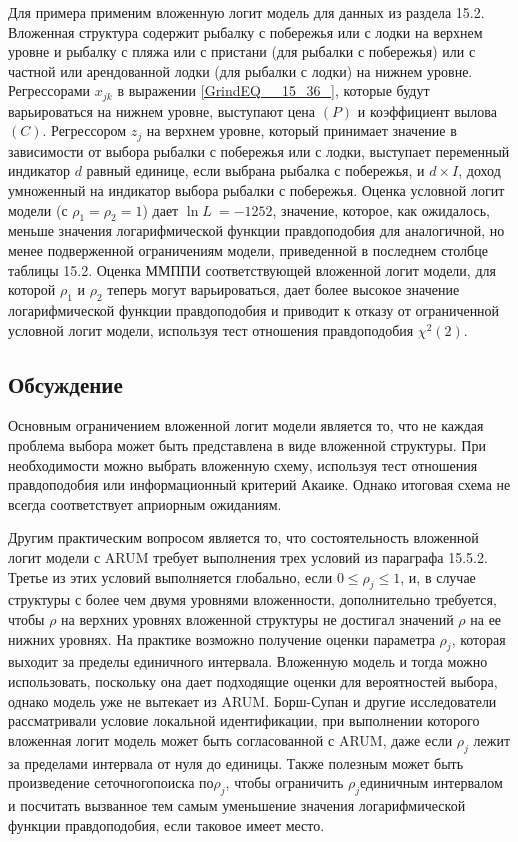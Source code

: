 Для примера применим вложенную логит модель для данных из раздела 15.2. Вложенная структура содержит рыбалку с побережья или с лодки на верхнем уровне и рыбалку с пляжа или с пристани (для рыбалки с побережья) или с частной или арендованной лодки (для рыбалки с лодки) на нижнем уровне. Регрессорами $x_{jk}$ в выражении \eqref{GrindEQ__15_36_}, которые будут варьироваться на нижнем уровне, выступают цена $(P)$ и коэффициент вылова $\left(C\right).$ Регрессором $z_j$ на верхнем уровне, который принимает значение в зависимости от выбора рыбалки с побережья или с лодки, выступает переменный индикатор $d$ равный единице, если выбрана рыбалка с побережья, и $d\times I$, доход умноженный на индикатор выбора рыбалки с побережья. Оценка условной логит модели (с ${\rho }_1={\rho }_2=1$) дает  ${\ln  L\ }=-1252$, значение, которое, как ожидалось, меньше значения логарифмической функции правдоподобия для аналогичной, но менее подверженной ограничениям модели, приведенной в последнем столбце таблицы 15.2. Оценка ММППИ соответствующей вложенной логит модели, для которой ${\rho }_1$ и ${\rho }_2$ теперь могут варьироваться, дает более высокое значение логарифмической функции правдоподобия и приводит к отказу от ограниченной условной логит модели, используя тест отношения правдоподобия $\chi^2(2)$.

\subsection{Обсуждение}

Основным ограничением вложенной логит модели является то, что не каждая проблема выбора может  быть представлена в виде вложенной структуры. При необходимости можно выбрать вложенную схему, используя тест отношения правдоподобия или информационный критерий Акаике. Однако итоговая схема не всегда соответствует априорным ожиданиям.

Другим практическим вопросом является то, что состоятельность вложенной логит модели с  ARUM требует выполнения трех условий из параграфа 15.5.2. 
Третье из этих условий выполняется глобально, если $0\le {\rho }_j\le 1$, и, в случае структуры с более чем двумя уровнями вложенности, дополнительно требуется, чтобы $\rho $ на верхних уровнях вложенной структуры не достигал значений $\rho $ на ее нижних уровнях. 
На практике возможно получение оценки параметра ${\rho }_j$, которая выходит за пределы единичного интервала. Вложенную модель и тогда можно использовать, поскольку она дает подходящие оценки для вероятностей выбора, однако модель уже не вытекает из ARUM. Борш-Супан и другие исследователи рассматривали условие локальной идентификации, при выполнении которого вложенная логит модель может быть согласованной с ARUM, даже если ${\rho }_j$ лежит за пределами интервала от нуля до единицы. Также полезным может быть произведение сеточногопоиска по${\rho }_j$, чтобы ограничить ${\rho }_j$единичным интервалом и посчитать вызванное тем самым уменьшение значения логарифмической функции правдоподобия, если таковое имеет место.

